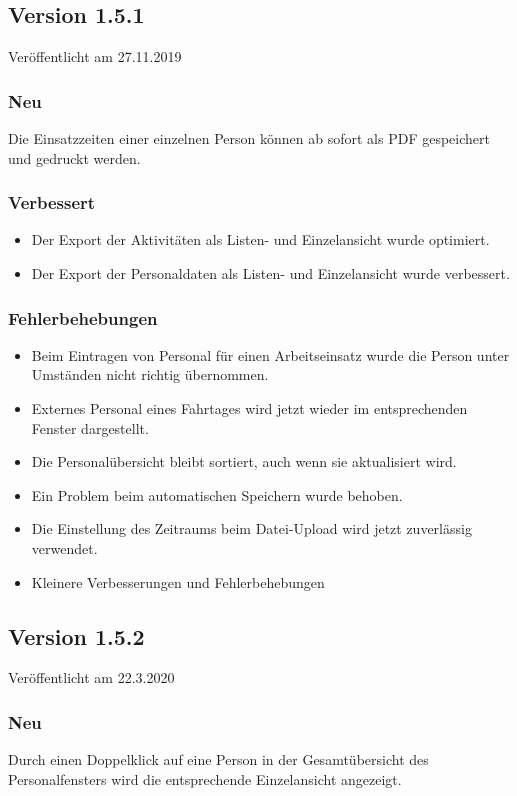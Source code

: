 \subsection{Version 1.5.1}
\label{version:1:5:1}
Veröffentlicht am 27.11.2019
\subsubsection{Neu}
Die Einsatzzeiten einer einzelnen Person können ab sofort als PDF gespeichert und gedruckt werden.

\subsubsection{Verbessert}
\begin{itemize}
  \item
  Der Export der Aktivitäten als Listen- und Einzelansicht wurde optimiert.
  \item
  Der Export der Personaldaten als Listen- und Einzelansicht wurde verbessert.
\end{itemize}

\subsubsection{Fehlerbehebungen}
\begin{itemize}
  \item
  Beim Eintragen von Personal für einen Arbeitseinsatz wurde die Person unter Umständen nicht richtig übernommen.
  \item
  Externes Personal eines Fahrtages wird jetzt wieder im entsprechenden Fenster dargestellt.
  \item
  Die Personalübersicht bleibt sortiert, auch wenn sie aktualisiert wird.
  \item
  Ein Problem beim automatischen Speichern wurde behoben.
  \item
  Die Einstellung des Zeitraums beim Datei-Upload wird jetzt zuverlässig verwendet.
  \item
  Kleinere Verbesserungen und Fehlerbehebungen
\end{itemize}


\subsection{Version 1.5.2}
\label{version:1:5:2}
Veröffentlicht am 22.3.2020
\subsubsection{Neu}
Durch einen Doppelklick auf eine Person in der Gesamtübersicht des Personalfensters wird die entsprechende Einzelansicht angezeigt.

